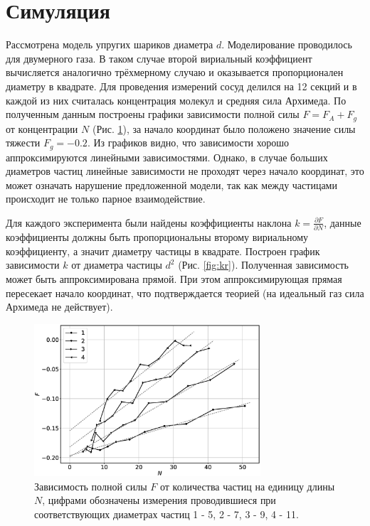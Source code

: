 \documentclass[12pt]{article}
\begin{document}
\section{Симуляция}
Рассмотрена модель упругих шариков диаметра $d$. Моделирование проводилось для двумерного газа. 
В таком случае второй вириальный коэффициент вычисляется аналогично трёхмерному случаю и оказывается 
пропорционален диаметру в квадрате. Для проведения измерений сосуд делился на 12 секций и в каждой из 
них считалась концентрация молекул и средняя сила Архимеда. По полученным данным построены графики 
зависимости полной силы $F = F_A + F_g$ от концентрации $N$ (Рис. \ref{fig:FN}), за начало координат 
было положено значение силы тяжести $F_g = -0.2$. Из графиков видно, что 
зависимости хорошо аппроксимируются линейными зависимостями. Однако, в случае больших 
диаметров частиц линейные зависимости не проходят через начало координат, это может означать 
нарушение предложенной модели, так как между частицами происходит не только парное взаимодействие. 

Для каждого эксперимента были найдены коэффициенты наклона $k = \frac{\partial F}{\partial N}$, 
данные коэффициенты должны быть пропорциональны второму вириальному коэффициенту, а значит диаметру 
частицы в квадрате. Построен график зависимости $k$ от диаметра частицы $d^2$ (Рис. \ref{fig:kr}). 
Полученная зависимость может быть аппроксимирована прямой. При этом аппроксимирующая прямая 
пересекает начало координат, что подтверждается теорией (на идеальный газ сила Архимеда не действует).

\begin{figure}[H]
    \centering
    \includegraphics[width=0.75\textwidth]{FN.eps}
    \caption{Зависимость полной силы $F$ от количества частиц на единицу длины $N$, цифрами обозначены 
    измерения проводившиеся при соответствующих диаметрах частиц 1 - 5, 2 - 7, 3 - 9, 4 - 11.}
    \label{fig:FN}
\end{figure}
\end{document}
